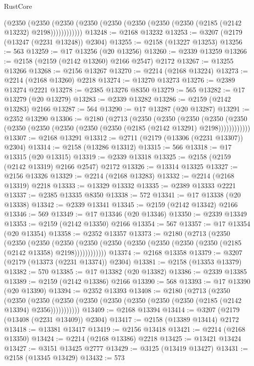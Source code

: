 \begin{lexlean}{RustCore}
\begin{coremodule}
          (@2350
            (@2350 (@2350 (@2350 (@2350 (@2350 (@2350 (@2350 (@2185 (@2142 @13232) @2198))))))))))))
@13248 := @2168 @13232
@13253 := @3207 (@2179 (@13247 (@2231 @13248)) @2304)
@13255 := @2158 (@13227 @13253)
@13256 := 563
@13259 := @17 @13256 (@20 @13256)
@13260 := @2339 @13259
@13266 := @2158 (@2159 (@2142 @13260) @2166 @2547) @2172
@13267 := @13255 @13266
@13268 := @2156 @13267
@13270 := @2214 (@2168 @13224)
@13273 := @2214 (@2168 @13260) @2218
@13274 := @13270 @13273
@13276 := @2389 @13274 @2221
@13278 := @2385 @13276 @8350
@13279 := 565
@13282 := @17 @13279 (@20 @13279)
@13283 := @2339 @13282
@13286 := @2159 (@2142 @13283) @2166
@13287 := 564
@13290 := @17 @13287 (@20 @13287)
@13291 := @2352 @13290
@13306 := @2180
    (@2713
      (@2350
        (@2350
          (@2350
            (@2350 (@2350 (@2350 (@2350 (@2350 (@2350 (@2350 (@2185 (@2142 @13291) @2198))))))))))))
@13307 := @2168 @13291
@13312 := @2711 (@2179 (@13306 (@2231 @13307)) @2304)
@13314 := @2158 (@13286 @13312)
@13315 := 566
@13318 := @17 @13315 (@20 @13315)
@13319 := @2339 @13318
@13325 := @2158 (@2159 (@2142 @13319) @2166 @2547) @2172
@13326 := @13314 @13325
@13327 := @2156 @13326
@13329 := @2214 (@2168 @13283)
@13332 := @2214 (@2168 @13319) @2218
@13333 := @13329 @13332
@13335 := @2389 @13333 @2221
@13337 := @2385 @13335 @8350
@13338 := 572
@13341 := @17 @13338 (@20 @13338)
@13342 := @2339 @13341
@13345 := @2159 (@2142 @13342) @2166
@13346 := 569
@13349 := @17 @13346 (@20 @13346)
@13350 := @2339 @13349
@13353 := @2159 (@2142 @13350) @2166
@13354 := 567
@13357 := @17 @13354 (@20 @13354)
@13358 := @2352 @13357
@13373 := @2180
    (@2713
      (@2350
        (@2350
          (@2350
            (@2350 (@2350 (@2350 (@2350 (@2350 (@2350 (@2350 (@2185 (@2142 @13358) @2198))))))))))))
@13374 := @2168 @13358
@13379 := @3207 (@2179 (@13373 (@2231 @13374)) @2304)
@13381 := @2158 (@13353 @13379)
@13382 := 570
@13385 := @17 @13382 (@20 @13382)
@13386 := @2339 @13385
@13389 := @2159 (@2142 @13386) @2166
@13390 := 568
@13393 := @17 @13390 (@20 @13390)
@13394 := @2352 @13393
@13408 := @2180
    (@2713
      (@2350
        (@2350
          (@2350 (@2350 (@2350 (@2350 (@2350 (@2350 (@2350 (@2185 (@2142 @13394) @2356)))))))))))
@13409 := @2168 @13394
@13414 := @3207 (@2179 (@13408 (@2231 @13409)) @2304)
@13417 := @2158 (@13389 @13414) @2172
@13418 := @13381 @13417
@13419 := @2156 @13418
@13421 := @2214 (@2168 @13350)
@13424 := @2214 (@2168 @13386) @2218
@13425 := @13421 @13424
@13427 := @3151 @13425 @2777
@13429 := @3125 (@13419 @13427)
@13431 := @2158 (@13345 @13429)
@13432 := 573

\end{coremodule}
\end{lexlean}
